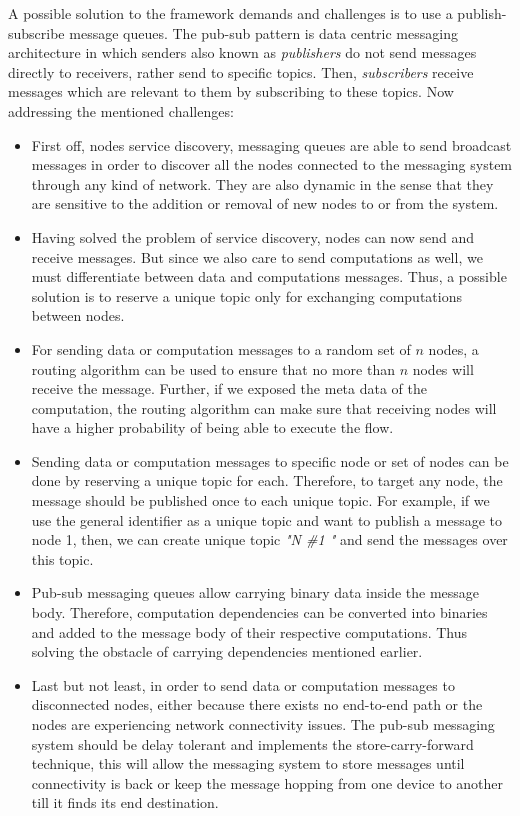 A possible solution to the framework demands and challenges is to use a publish-subscribe message queues. The pub-sub pattern is data centric messaging architecture in which senders also known as \textit{publishers} do not send messages directly to receivers, rather send to specific topics. Then, \textit{subscribers} receive messages which are relevant to them by subscribing to these topics. Now addressing the mentioned challenges:

\begin{itemize}
\item First off, nodes service discovery, messaging queues are able to send broadcast messages in order to discover all the nodes connected to the messaging system through any kind of network.  They are also dynamic in the sense that they are sensitive to the addition or removal of new nodes to or from the system. 

\item  Having solved the problem of service discovery, nodes can now send and receive messages. But since we also care to send computations as well, we must differentiate between data  and computations messages. Thus, a possible solution is to reserve a unique topic only for exchanging computations between nodes.

\item For sending data or computation messages to a random set of  \(n\) nodes, a routing algorithm can be used to ensure that no more than \(n\) nodes will receive the message. Further, if we exposed the meta data of the computation, the routing algorithm can make sure that receiving nodes will have a higher probability of being able to execute the flow.

\item Sending data or computation messages to specific node or set of nodes can be done by reserving a unique topic for each. Therefore, to target any node, the message should be published once to each unique topic. For example, if we use the general identifier as a unique topic and want to publish a message to node 1, then, we can create  unique topic \textit{"N \#1 "} and send the messages over this topic.

 
\item Pub-sub messaging queues allow carrying binary data inside the message body. Therefore, computation dependencies can be converted into binaries and added to the message body of their respective computations. Thus solving the obstacle of carrying dependencies mentioned earlier.

\item Last but not least, in order to send data or computation messages to disconnected nodes, either because there exists no end-to-end path or the nodes are experiencing network connectivity issues. The pub-sub messaging system should be delay tolerant and implements the store-carry-forward technique, this will allow the messaging system to store messages until connectivity is back or keep the message hopping from one device to another till it finds its end destination.

\end{itemize}





